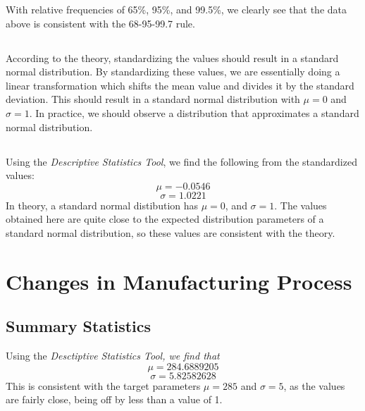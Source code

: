 \documentclass[letterpaper]{article}
\begin{document}
With relative frequencies of 65\%, 95\%, and 99.5\%, we clearly see that the
data above is consistent with the 68-95-99.7 rule.

\subsection{} %

According to the theory, standardizing the values should result in a standard
normal distribution. By standardizing these values, we are essentially doing a
linear transformation which shifts the mean value and divides it by the standard
deviation. This should result in a standard normal distribution with $\mu=0$ and
$\sigma=1$. In practice, we should observe a distribution that approximates a
standard normal distribution.


\subsection{} %
Using the \textit{Descriptive Statistics Tool}, we find the following from the standardized values:
$$\mu = -0.0546$$
$$\sigma = 1.0221$$
In theory, a standard normal distibution has $\mu=0$, and $\sigma=1$. The values
obtained here are quite close to the expected distribution parameters of a
standard normal distribution, so these values are consistent with the theory.

\section{Changes in Manufacturing Process}%

\subsection{Summary Statistics} %
Using the \textit{Desctiptive Statistics Tool, we find that}
$$\mu = 284.6889205$$
$$\sigma = 5.82582628$$
This is consistent with the target parameters $\mu=285$ and $\sigma=5$,
as the values are fairly close, being off by less than a value of 1.
\end{document}

